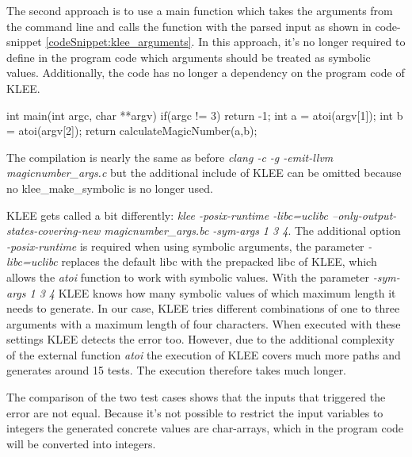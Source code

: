 The second approach is to use a main function which takes the arguments from the command line and calls the function with the parsed input as shown in code-snippet \ref{codeSnippet:klee_arguments}.
In this approach, it's no longer required to define in the program code which arguments should be treated as symbolic values. Additionally, the code has no longer a dependency on the program code of KLEE.

\begin{codesnippet}[caption={Main function which parses two input arguments and calls the function calculateMagicNumber of code-snippet \ref{codeSnippet:symbolicExecution}}, label={codeSnippet:klee_arguments}]
int main(int argc, char **argv) {
  if(argc != 3){
	return -1;
  }
  int a = atoi(argv[1]);
  int b = atoi(argv[2]);
  return calculateMagicNumber(a,b);
}
\end{codesnippet}

The compilation is nearly the same as before \textit{clang -c -g -emit-llvm magicnumber\_args.c} but the additional include of KLEE can be omitted because no klee\_make\_symbolic is no longer used.

KLEE gets called a bit differently: \textit{klee -posix-runtime -libc=uclibc --only-output-states-covering-new magicnumber\_args.bc -sym-args 1 3 4}.
The additional option \textit{-posix-runtime} is required when using symbolic arguments, the parameter \textit{-libc=uclibc} replaces the default libc with the prepacked libc of KLEE, which allows the \textit{atoi} function to work with symbolic values.
With the parameter \textit{-sym-args 1 3 4} KLEE knows how many symbolic values of which maximum length it needs to generate. In our case, KLEE tries different combinations of one to three arguments with a maximum length of four characters.
When executed with these settings KLEE detects the error too. However, due to the additional complexity of the external function \textit{atoi} the execution of KLEE covers much more paths and generates around 15 tests. The execution therefore takes much longer.

The comparison of the two test cases shows that the inputs that triggered the error are not equal.
Because it's not possible to restrict the input variables to integers the generated concrete values are char-arrays, which in the program code will be converted into integers.


